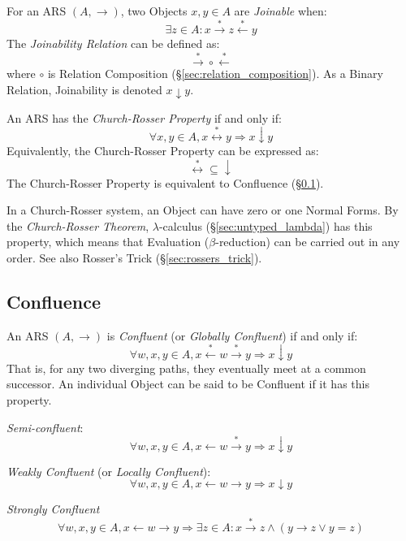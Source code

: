 For an ARS $(A, \rightarrow)$, two Objects $x,y\in A$ are
\emph{Joinable} when:
\[
  \exists z \in A :
  x \stackrel{*}\rightarrow z \stackrel{*}\leftarrow y
\]
The \emph{Joinability Relation} can be defined as:
\[
  \stackrel{*}\rightarrow \circ \stackrel{*}\leftarrow
\]
where $\circ$ is Relation Composition
(\S\ref{sec:relation_composition}). As a Binary Relation, Joinability
is denoted $x \downarrow y$.

An ARS has the \emph{Church-Rosser Property} if and only if:
\[
  \forall x,y \in A, x \stackrel{*}\leftrightarrow y
  \Rightarrow x \downarrow y
\]
Equivalently, the Church-Rosser Property can be expressed as:
\[
  \stackrel{*}\leftrightarrow \subseteq \downarrow
\]
The Church-Rosser Property is equivalent to Confluence
(\S\ref{sec:rewrite_confluence}).

In a Church-Rosser system, an Object can have zero or one Normal
Forms. By the \emph{Church-Rosser Theorem}, $\lambda$-calculus
(\S\ref{sec:untyped_lambda}) has this property, which means that
Evaluation ($\beta$-reduction) can be carried out in any order. See
also Rosser's Trick (\S\ref{sec:rossers_trick}).



\subsection{Confluence}\label{sec:rewrite_confluence}

An ARS $(A, \rightarrow)$ is \emph{Confluent} (or \emph{Globally
  Confluent}) if and only if:
\[
  \forall w,x,y \in A,
  x \stackrel{*}\leftarrow w \stackrel{*}\rightarrow y
  \Rightarrow x \downarrow y
\]
That is, for any two diverging paths, they eventually meet at a common
successor. An individual Object can be said to be Confluent if it has
this property.

\emph{Semi-confluent}:
\[
  \forall w,x,y \in A,
  x \leftarrow w \stackrel{*}\rightarrow y
  \Rightarrow x \downarrow y
\]

\emph{Weakly Confluent} (or \emph{Locally Confluent}):
\[
  \forall w,x,y \in A,
  x \leftarrow w \rightarrow y \Rightarrow x \downarrow y
\]

\emph{Strongly Confluent}
\[
  \forall w,x,y \in A,
  x \leftarrow w \rightarrow y \Rightarrow
  \exists z \in A : x \stackrel{*}\rightarrow z \wedge
  (y \rightarrow z \vee y = z)
\]

